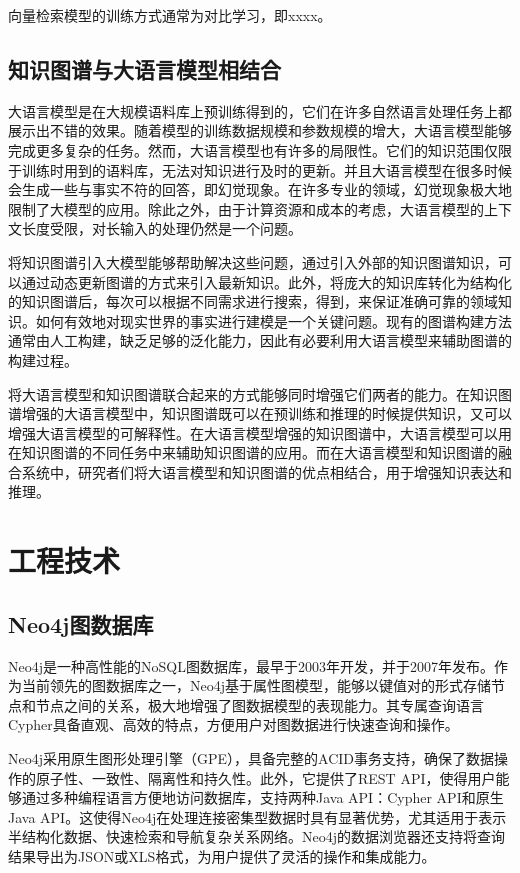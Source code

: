 向量检索模型的训练方式通常为对比学习，即xxxx。

\subsection{知识图谱与大语言模型相结合}

大语言模型是在大规模语料库上预训练得到的，它们在许多自然语言处理任务上都展示出不错的效果。随着模型的训练数据规模和参数规模的增大，大语言模型能够完成更多复杂的任务。然而，大语言模型也有许多的局限性。它们的知识范围仅限于训练时用到的语料库\cite{AlKhamissi2022}，无法对知识进行及时的更新。并且大语言模型在很多时候会生成一些与事实不符的回答\cite{Ji2023}，即幻觉现象。在许多专业的领域，幻觉现象极大地限制了大模型的应用。除此之外，由于计算资源和成本的考虑，大语言模型的上下文长度受限，对长输入的处理仍然是一个问题。

将知识图谱引入大模型能够帮助解决这些问题，通过引入外部的知识图谱知识，可以通过动态更新图谱的方式来引入最新知识。此外，将庞大的知识库转化为结构化的知识图谱后，每次可以根据不同需求进行搜索，得到，来保证准确可靠的领域知识。如何有效地对现实世界的事实进行建模是一个关键问题。现有的图谱构建方法通常由人工构建，缺乏足够的泛化能力，因此有必要利用大语言模型来辅助图谱的构建过程。

将大语言模型和知识图谱联合起来的方式能够同时增强它们两者的能力。在知识图谱增强的大语言模型中，知识图谱既可以在预训练和推理的时候提供知识\cite{Zhang2019}，又可以增强大语言模型的可解释性\cite{Lin2019}。在大语言模型增强的知识图谱中，大语言模型可以用在知识图谱的不同任务中来辅助知识图谱的应用。而在大语言模型和知识图谱的融合系统中，研究者们将大语言模型和知识图谱的优点相结合，用于增强知识表达\cite{Yasunaga2022}和推理\cite{Choudhary2023}。

\section{工程技术}

\subsection{Neo4j图数据库}

Neo4j是一种高性能的NoSQL图数据库，最早于2003年开发，并于2007年发布。作为当前领先的图数据库之一，Neo4j基于属性图模型，能够以键值对的形式存储节点和节点之间的关系，极大地增强了图数据模型的表现能力。其专属查询语言Cypher具备直观、高效的特点，方便用户对图数据进行快速查询和操作。

Neo4j采用原生图形处理引擎（GPE），具备完整的ACID事务支持，确保了数据操作的原子性、一致性、隔离性和持久性。此外，它提供了REST API，使得用户能够通过多种编程语言方便地访问数据库，支持两种Java API：Cypher API和原生Java API。这使得Neo4j在处理连接密集型数据时具有显著优势，尤其适用于表示半结构化数据、快速检索和导航复杂关系网络。Neo4j的数据浏览器还支持将查询结果导出为JSON或XLS格式，为用户提供了灵活的操作和集成能力。

